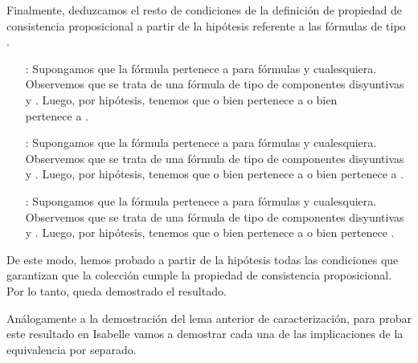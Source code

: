 \begin{isabellebody}
\begin{isamarkuptext}
\begin{demostracion}
  Finalmente, deduzcamos el resto de condiciones de la definición de propiedad de consistencia
  proposicional a partir de la hipótesis referente a las fórmulas de tipo \isa{{\isasymbeta}}.
  \begin{enumerate}
    \item[\isa{{\isadigit{4}}{\isacharparenright}}:] Supongamos que la fórmula  pertenece a  para fórmulas  y 
    cualesquiera. Observemos que se trata de una fórmula de tipo \isa{{\isasymbeta}} de componentes disyuntivas
     y . Luego, por hipótesis, tenemos que o bien  pertenece a  o bien\\
     pertenece a .
    \item[\isa{{\isadigit{5}}{\isacharparenright}}:] Supongamos que la fórmula  pertenece a  para fórmulas  y 
    cualesquiera. Observemos que se trata de una fórmula de tipo \isa{{\isasymbeta}} de componentes disyuntivas
     y . Luego, por hipótesis, tenemos que o bien  pertenece a  o
    bien  pertenece a .
    \item[\isa{{\isadigit{7}}{\isacharparenright}}:] Supongamos que la fórmula  pertenece a  para fórmulas  y 
    cualesquiera. Observemos que se trata de una fórmula de tipo \isa{{\isasymbeta}} de componentes disyuntivas
     y . Luego, por hipótesis, tenemos que o bien  pertenece a  o
    bien  pertenece .
  \end{enumerate} 

  De este modo, hemos probado a partir de la hipótesis todas las condiciones que garantizan que la
  colección  cumple la propiedad de consistencia proposicional. Por lo tanto, queda demostrado el
  resultado.
\end{demostracion}

  Análogamente a la demostración del lema anterior de caracterización, para probar este resultado en 
  Isabelle vamos a demostrar cada una de las implicaciones de la equivalencia por separado. 


\end{isamarkuptext}
\end{isabellebody}
